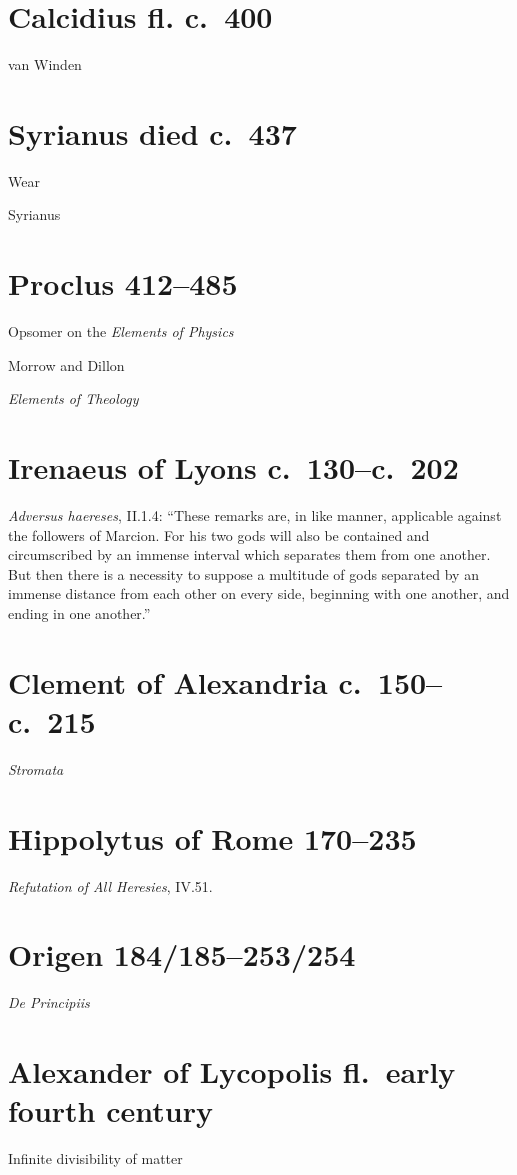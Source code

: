 \documentclass{article}
\begin{document}
\section{Calcidius fl. c.~400}
van Winden \cite[p.~155]{vanwinden}


\section{Syrianus died c.~437}
Wear \cite{wear}

Syrianus \cite[p.~57]{syrianus13to14}


\section{Proclus 412--485}
Opsomer \cite{opsomer} on the {\em Elements of Physics}

Morrow and Dillon \cite{proclus}

{\em Elements of Theology} \cite{dodds}


\section{Irenaeus of Lyons c.~130--c.~202}
{\em Adversus haereses}, II.1.4: ``These remarks are, in like manner, applicable against the followers of Marcion. For his two gods will also be contained and circumscribed by an immense interval which separates them from one another. But then there is a necessity to suppose a multitude of gods separated by an immense distance from each other on every side, beginning with one another, and ending in one another.''

\section{Clement of Alexandria c.~150--c.~215}
{\em Stromata}

\section{Hippolytus of Rome 170--235}
{\em Refutation of All Heresies}, IV.51.



\section{Origen 184/185--253/254}
{\em De Principiis}

\section{Alexander of Lycopolis fl.~early fourth century}
Infinite divisibility of matter \cite{lycopolis}
\end{document}
